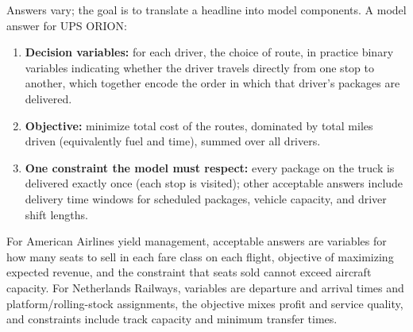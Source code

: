 
Answers vary; the goal is to translate a headline into model components. A model answer for UPS ORION:
\begin{enumerate}
\item[(a)] \textbf{Decision variables:} for each driver, the choice of route, in practice binary variables indicating whether the driver travels directly from one stop to another, which together encode the order in which that driver's packages are delivered.
\item[(b)] \textbf{Objective:} minimize total cost of the routes, dominated by total miles driven (equivalently fuel and time), summed over all drivers.
\item[(c)] \textbf{One constraint the model must respect:} every package on the truck is delivered exactly once (each stop is visited); other acceptable answers include delivery time windows for scheduled packages, vehicle capacity, and driver shift lengths.
\end{enumerate}
For American Airlines yield management, acceptable answers are variables for how many seats to sell in each fare class on each flight, objective of maximizing expected revenue, and the constraint that seats sold cannot exceed aircraft capacity. For Netherlands Railways, variables are departure and arrival times and platform/rolling-stock assignments, the objective mixes profit and service quality, and constraints include track capacity and minimum transfer times.


